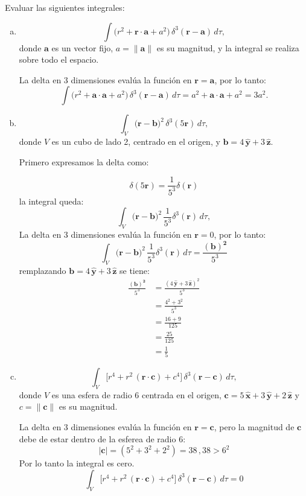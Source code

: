 \documentclass[12pt]{article}
\begin{document}
Evaluar las siguientes integrales:
\begin{enumerate}[(a)]

    \item 
    \[
    \int \bigl(r^2 + \mathbf{r}\cdot\mathbf{a} + a^2\bigr)\,\delta^3(\mathbf{r} - \mathbf{a}) \, d\tau,
    \]
    donde \(\mathbf{a}\) es un vector fijo, \(a = \|\mathbf{a}\|\) es su magnitud, y la integral se realiza sobre todo el espacio.
    
    La delta en 3 dimensiones evalúa la función en \(\mathbf{r} = \mathbf{a}\), por lo tanto:
    \[
    \int \bigl(r^2 + \mathbf{a}\cdot\mathbf{a} + a^2\bigr)\,\delta^3(\mathbf{r} - \mathbf{a}) \, d\tau = a^2 + \mathbf{a}\cdot \mathbf{a}   + a^2 = \boxed{3a^2}.
    \]
    \item 
    \[
    \int_V \bigl(\mathbf{r} - \mathbf{b}\bigr)^2 \,\delta^3(5\mathbf{r}) \, d\tau,
    \]
    donde \(V\) es un cubo de lado 2, centrado en el origen, y \(\mathbf{b} = 4\,\hat{\mathbf{y}} + 3\,\hat{\mathbf{z}}\).

    Primero expresamos la delta como:

    \[ \delta(5 \mathbf{r} )= \frac{1}{5^3}\delta(\mathbf{r} ) \]
    la integral queda:
    \[
    \int_V \bigl(\mathbf{r} - \mathbf{b}\bigr)^2 \,\frac{1}{5^3} \delta^3(\mathbf{r}) \, d\tau,
    \]
    La delta en 3 dimensiones evalúa la función en \(\mathbf{r} = 0\), por lo tanto:
    \[ \int_V \bigl(\mathbf{r} - \mathbf{b}\bigr)^2 \,\frac{1}{5^3} \delta^3(\mathbf{r}) \, d\tau = \frac{\mathbf{(b)^2} }{5^3}  \]
    remplazando \(\mathbf{b}= 4\,\hat{\mathbf{y}} + 3\,\hat{\mathbf{z}}\) se tiene:
    \begin{align*}
        \frac{\mathbf{(b)^2} }{5^3} &= \frac{(4\,\hat{\mathbf{y}} + 3\,\hat{\mathbf{z}})^2}{5^3}\\
    & =\frac{4^2+3^2}{5^3} \\
    & =\frac{16+9}{125} \\
    & =\frac{25}{125} \\
    & =\boxed{\frac{1}{5}}
    \end{align*}
   
    \item 
    \[
    \int_V \bigl[r^4 + r^2\,(\mathbf{r}\cdot\mathbf{c}) + c^4\bigr]\,
    \delta^3(\mathbf{r} - \mathbf{c}) \, d\tau,
    \]
    donde \(V\) es una esfera de radio 6 centrada en el origen, \(\mathbf{c} = 5\,\hat{\mathbf{x}} + 3\,\hat{\mathbf{y}} + 2\,\hat{\mathbf{z}}\) y \(c = \|\mathbf{c}\|\) es su magnitud.
    
    La delta en 3 dimensiones evalúa la función en \(\mathbf{r} = \mathbf{c}\), pero la magnitud de $\mathbf{c}$  debe de estar dentro de la esferea de radio 6:
    \[|\mathbf{c} |= (5^2+3^2+2^2) = 38 \,, 38 > 6^2\]
    Por lo tanto la integral es cero.
    \[\int_V \bigl[r^4 + r^2\,(\mathbf{r}\cdot\mathbf{c}) + c^4\bigr]\,
    \delta^3(\mathbf{r} - \mathbf{c}) \, d\tau = \boxed{0} \]



\end{enumerate}
\end{document}
